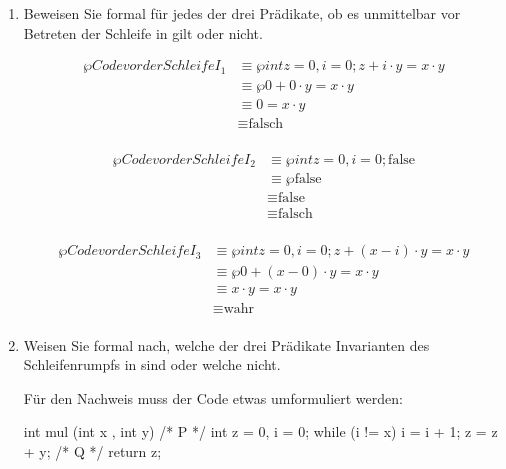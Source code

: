 \documentclass{bschlangaul-aufgabe}
\begin{document}
\begin{enumerate}



\item Beweisen Sie formal für jedes der drei Prädikate, ob es
unmittelbar vor Betreten der Schleife in  gilt oder nicht.

\begin{bAntwort}
\begin{align*}
\wp{Code vor der Schleife}{I_1}
& \equiv \wp{int z = 0, i = 0;}{z + i \cdot y = x \cdot y} \\
& \equiv \wp{}{0 + 0 \cdot y = x \cdot y} \\
& \equiv 0 = x \cdot y \\
& \equiv \text{falsch} \\
\end{align*}

\begin{align*}
\wp{Code vor der Schleife}{I_2}
& \equiv \wp{int z = 0, i = 0;}{\text{false}} \\
& \equiv \wp{}{\text{false}} \\
& \equiv \text{false} \\
& \equiv \text{falsch} \\
\end{align*}

\begin{align*}
\wp{Code vor der Schleife}{I_3}
& \equiv \wp{int z = 0, i = 0;}{z + (x - i) \cdot y = x \cdot y} \\
& \equiv \wp{}{0 + (x - 0) \cdot y = x \cdot y} \\
& \equiv x \cdot y = x \cdot y \\
& \equiv \text{wahr} \\
\end{align*}
\end{bAntwort}


\item Weisen Sie formal nach, welche der drei Prädikate Invarianten des
Schleifenrumpfs in  sind oder welche nicht.

\begin{bAntwort}
Für den Nachweis muss der Code etwas umformuliert werden:

\begin{bJavaAngabe}
int mul (int x , int y) {
  /* P */
  int z = 0, i = 0;
  while (i != x) {
    i = i + 1;
    z = z + y;
  }
  /* Q */
  return z;
}
\end{bJavaAngabe}


\end{bAntwort}
\end{enumerate}
\end{document}
